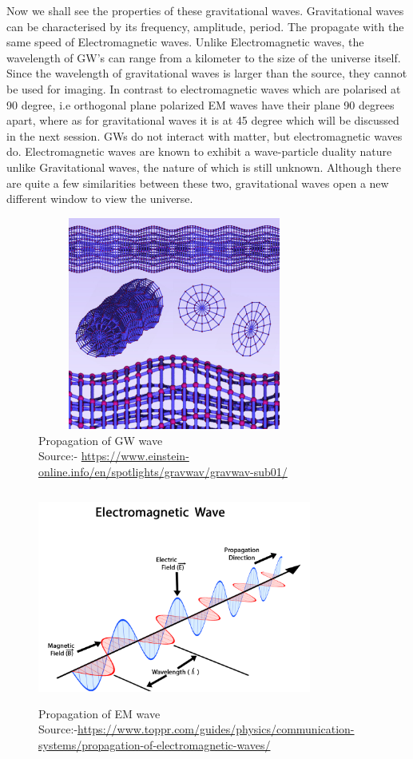 Now we shall see the properties of these gravitational waves. Gravitational waves can be characterised by its frequency, amplitude, period. The propagate with the same speed of Electromagnetic waves. Unlike Electromagnetic waves, the wavelength of GW’s can range from a kilometer to the size of the universe itself. Since the wavelength of gravitational waves is larger than the source, they cannot be used for imaging. In contrast to electromagnetic waves which are polarised at 90 degree, i.e orthogonal plane polarized EM waves have their plane 90 degrees apart, where as for gravitational waves it is at 45 degree which will be discussed in the next session. GWs do not interact with matter, but electromagnetic waves do. Electromagnetic waves are known to exhibit a wave-particle duality nature unlike Gravitational waves, the nature of which is still unknown. Although there are quite a few similarities between these two, gravitational waves open a new different window to view the universe. \cite{Thorne:1995xs}

\begin{figure}[h]
    \centering
    \includegraphics[height= 7cm, width=9cm]{images.tex/GW_propagation.jpg}
    \caption{Propagation of GW wave\\ Source:- \url{https://www.einstein-online.info/en/spotlights/gravwav/gravwav-sub01/}}
\end{figure}

\begin{figure}[h]
    \centering
    \includegraphics[height= 7cm, width=9cm]{images.tex/EM_propagation.png}
    \caption{Propagation of EM wave\\
    Source:-\;\url{https://www.toppr.com/guides/physics/communication-systems/propagation-of-electromagnetic-waves/}}
\end{figure}

\pagebreak
